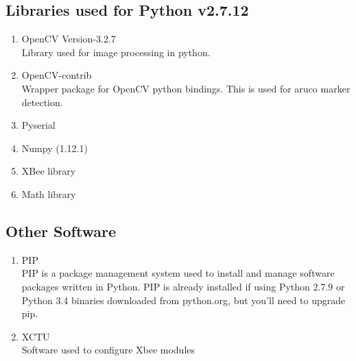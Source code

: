 \documentclass[main.tex]{subfiles}
\begin{document}
	\subsection{Libraries used for Python v2.7.12}
	\begin{enumerate}
		\item OpenCV Version-3.2.7 \\
		Library used for image processing in python.
		\item OpenCV-contrib \href{https://github.com/skvark/opencv-python}{\ExternalLink}\\
		Wrapper package for OpenCV python bindings. This is used for aruco marker detection.
		\item Pyserial
		\item Numpy (1.12.1)
		\item XBee library
		\item Math library
	\end{enumerate}
	
	\subsection{Other Software}
	\begin{enumerate}
		\item PIP\\
		PIP is a package management system used to install and manage software packages written in Python.
		PIP is already installed if using Python 2.7.9 or Python 3.4 binaries downloaded from python.org, but you'll need to upgrade pip.
		\href{https://pip.pypa.io/en/stable/installing/}{\ExternalLink}
		\item XCTU\href{https://www.digi.com/products/xbee-rf-solutions/xctu-software/xctu}{\ExternalLink}\\
		Software used to configure Xbee modules
	\end{enumerate}	
\end{document}
